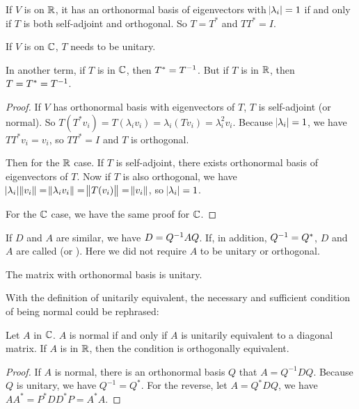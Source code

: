 \begin{theorem}
    If $V$ is on $\mathbb{R}$, it has an orthonormal basis of eigenvectors with $\abs{\lambda_i} = 1$ if and only if $T$ is both self-adjoint and orthogonal. So $T = T^*$ and $TT^* = I$.
    
    If $V$ is on $\mathbb{C}$, $T$ needs to be unitary.
    
    In another term, if $T$ is in $\mathbb{C}$, then $T^* = {T}^{-1}$. But if $T$ is in $\mathbb{R}$, then $T = T^* = {T}^{-1}$.
\end{theorem}
\begin{proof}
    If $V$ has orthonormal basis with eigenvectors of $T$, $T$ is self-adjoint (or normal). So $T(T^* v_i) = T (\lambda_i v_i) = \lambda_i (T v_i) = \lambda_i^2 v_i$. Because $\abs{\lambda_i} = 1$, we have $TT^* v_i = v_i$, so $TT^* = I$ and $T$ is orthogonal.
    
    Then for the $\mathbb{R}$ case. If $T$ is self-adjoint, there exists orthonormal basis of eigenvectors of $T$. Now if $T$ is also orthogonal, we have $\abs{\lambda_i} \norm{v_i} = \norm{\lambda_i v_i} = \norm{T (v_i)} = \norm{v_i}$, so $\abs{\lambda_i} = 1$. 
    
    For the $\mathbb{C}$ case, we have the same proof for $\mathbb{C}$.
\end{proof}


\begin{definition}    
    If $D$ and $A$ are similar, we have $D = {Q}^{-1} A Q$. If, in addition, ${Q}^{-1} = Q^*$, $D$ and $A$ are called  (or ). Here we did not require $A$ to be unitary or orthogonal.
\end{definition}


\begin{theorem}
    The matrix with orthonormal basis is unitary.
\end{theorem}


With the definition of unitarily equivalent, the necessary and sufficient condition of being normal could be rephrased:
\begin{theorem}
    Let $A$ in $\mathbb{C}$. $A$ is normal if and only if $A$ is unitarily equivalent to a diagonal matrix. If $A$ is in $\mathbb{R}$, then the condition is orthogonally equivalent.
\end{theorem}
\begin{proof}
    If $A$ is normal, there is an orthonormal basis $Q$ that $A = Q^{-1} D Q$. Because $Q$ is unitary, we have $Q^{-1} = Q^*$. 
    For the reverse, let $A=Q^* D Q$, we have $AA^* = P^* D D^* P = A^* A$.
\end{proof}

